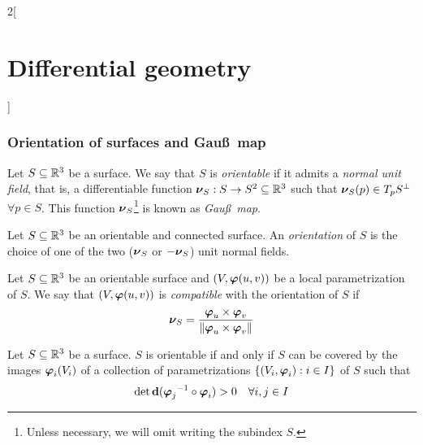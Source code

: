 \documentclass[../../../main.tex]{subfiles}
\begin{document}
\begin{multicols}{2}[\section{Differential geometry}]
  \subsubsection{Orientation of surfaces and Gau\ss\ map}
  \begin{definition}
    Let $S\subseteq\mathbb{R}^3$ be a surface. We say that $S$ is \emph{orientable} if it admits a \emph{normal unit field}, that is, a differentiable function $\boldsymbol{\mathrm{\nu}}_S:S\rightarrow S^2\subseteq\mathbb{R}^3$ such that $\boldsymbol{\mathrm{\nu}}_S(p)\in T_pS^\perp$ $\forall p\in S$. This function $\boldsymbol{\mathrm{\nu}}_S$\footnote{Unless necessary, we will omit writing the subindex $S$.} is known as \emph{Gau\ss\ map}.
  \end{definition}
  \begin{definition}
    Let $S\subseteq\mathbb{R}^3$ be an orientable and connected surface. An \emph{orientation} of $S$ is the choice of one of the two ($\boldsymbol{\mathrm{\nu}}_S$ or $-\boldsymbol{\mathrm{\nu}}_S$) unit normal fields.
  \end{definition}
  \begin{definition}
    Let $S\subseteq\mathbb{R}^3$ be an orientable surface and $(V,\boldsymbol{\mathrm{\varphi}}(u,v))$ be a local parametrization of $S$. We say that $(V,\boldsymbol{\mathrm{\varphi}}(u,v))$ is \emph{compatible} with the orientation of $S$ if $$\boldsymbol{\mathrm{\nu}}_S=\frac{\boldsymbol{\mathrm{\varphi}}_u\times\boldsymbol{\mathrm{\varphi}}_v}{\|\boldsymbol{\mathrm{\varphi}}_u\times\boldsymbol{\mathrm{\varphi}}_v\|}$$
  \end{definition}
  \begin{proposition}
    Let $S\subseteq\mathbb{R}^3$ be a surface. $S$ is orientable if and only if $S$ can be covered by the images $\boldsymbol{\mathrm{\varphi}}_i(V_i)$ of a collection of parametrizations $\{(V_i,\boldsymbol{\mathrm{\varphi}}_i):i\in I\}$ of $S$ such that $$\det\boldsymbol{\mathrm{\dd}}({\boldsymbol{\mathrm{\varphi}}_j}^{-1}\circ\boldsymbol{\mathrm{\varphi}}_i)>0\quad\forall i,j\in I$$
  \end{proposition}

\end{multicols}
\end{document}
